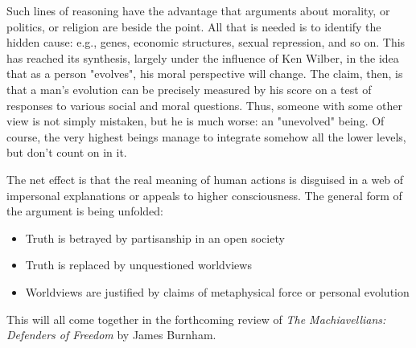 Such lines of reasoning have the advantage that arguments about morality, or politics, or religion are beside the point. All that is needed is to identify the hidden cause: e.g., genes, economic structures, sexual repression, and so on. This has reached its synthesis, largely under the influence of Ken Wilber, in the idea that as a person "evolves", his moral perspective will change. The claim, then, is that a man's evolution can be precisely measured by his score on a test of responses to various social and moral questions. Thus, someone with some other view is not simply mistaken, but he is much worse: an "unevolved" being. Of course, the very highest beings manage to integrate somehow all the lower levels, but don't count on in it.

The net effect is that the real meaning of human actions is disguised in a web of impersonal explanations or appeals to higher consciousness. The general form of the argument is being unfolded:

\begin{itemize}


\item Truth is betrayed by partisanship in an open society

\item Truth is replaced by unquestioned worldviews

\item Worldviews are justified by claims of metaphysical force or personal evolution
\end{itemize}


This will all come together in the forthcoming review of \textit{The Machiavellians: Defenders of Freedom} by James Burnham.



